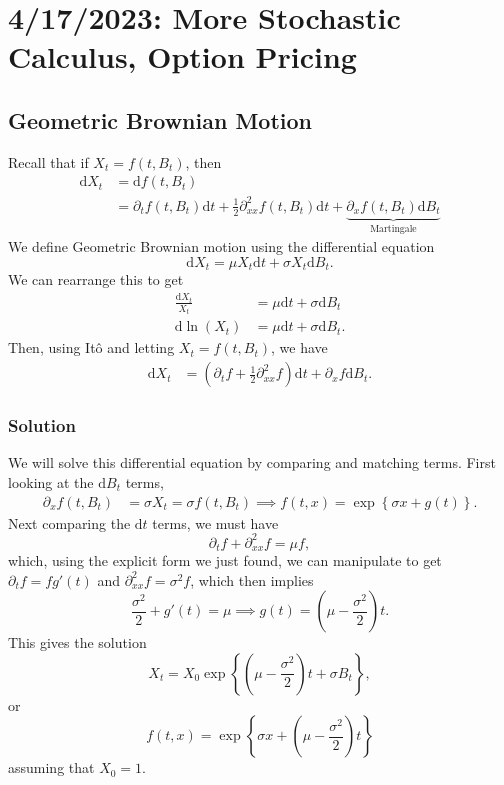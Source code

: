 \chapter{4/17/2023: More Stochastic Calculus, Option Pricing}
\section{Geometric Brownian Motion}
Recall that if $X_t = f(t,B_t)$, then \begin{align*}
	\mathrm dX_t &= \mathrm df(t,B_t) \\
				 &= \partial_t f(t,B_t)\mathrm dt + \frac{1}{2}\partial_{xx}^2 f(t,B_t)\mathrm dt + \underbrace{\partial_x f(t,B_t)\mathrm dB_t}_{\text{Martingale}}
\end{align*} We define Geometric Brownian motion using the differential equation $$ \mathrm dX_t = \mu X_t \mathrm dt + \sigma X_t \mathrm dB_t. $$ We can rearrange this to get \begin{align*}
	\frac{\mathrm dX_t}{X_t} &= \mu\mathrm dt + \sigma\mathrm dB_t \\
	\mathrm d\ln(X_t) &= \mu\mathrm dt + \sigma\mathrm dB_t.
\end{align*} Then, using It\^{o} and letting $X_t = f(t,B_t)$, we have \begin{align*}
	\mathrm dX_t &= \left( \partial_t f + \frac{1}{2}\partial_{xx}^2 f \right) \mathrm dt + \partial_x f\mathrm dB_t.
\end{align*} 
\subsection{Solution}
We will solve this differential equation by comparing and matching terms. First looking at the $\mathrm dB_t$ terms, \begin{align*}
	\partial_x f(t,B_t) &= \sigma X_t = \sigma f(t,B_t) 
	\implies f(t,x) = \exp \left\{ \sigma x + g(t) \right\}.
\end{align*} Next comparing the $\mathrm dt$ terms, we must have $$ \partial_t f + \partial_{xx}^2 f = \mu f, $$ which, using the explicit form we just found, we can manipulate to get $\partial_t f = f g'(t)$ and $\partial_{xx}^2 f = \sigma^2 f$, which then implies $$ \frac{\sigma^2}{2} + g'(t) = \mu \implies g(t) = \left(\mu-\frac{\sigma^2}{2}\right)t. $$ This gives the solution $$ X_t = X_0 \exp \left\{ \left( \mu-\frac{\sigma^2}{2} \right) t + \sigma B_t \right\}, $$ or $$ f(t,x) = \exp \left\{ \sigma x + \left( \mu-\frac{\sigma^2}{2} \right) t \right\} $$ assuming that $X_0 = 1$.

